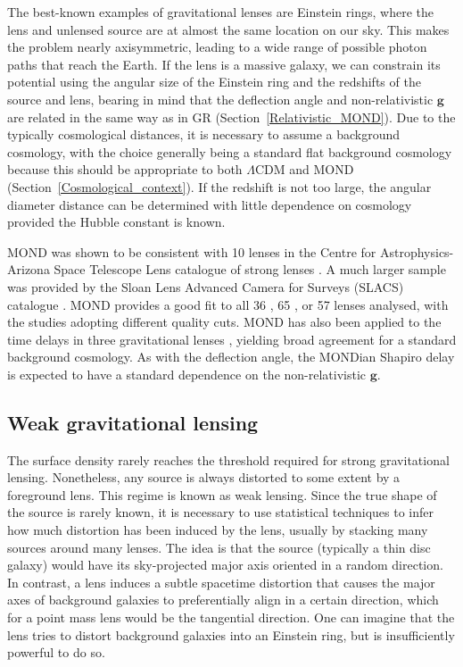 \documentclass[fleqn,usenatbib,useAMS]{mnras} %
\begin{document}
The best-known examples of gravitational lenses are Einstein rings, where the lens and unlensed source are at almost the same location on our sky. This makes the problem nearly axisymmetric, leading to a wide range of possible photon paths that reach the Earth. If the lens is a massive galaxy, we can constrain its potential using the angular size of the Einstein ring and the redshifts of the source and lens, bearing in mind that the deflection angle and non-relativistic $\bm{g}$ are related in the same way as in GR (Section~\ref{Relativistic_MOND}). Due to the typically cosmological distances, it is necessary to assume a background cosmology, with the choice generally being a standard flat background cosmology because this should be appropriate to both $\Lambda$CDM and MOND (Section~\ref{Cosmological_context}). If the redshift is not too large, the angular diameter distance can be determined with little dependence on cosmology provided the Hubble constant is known.

MOND was shown to be consistent with 10 lenses in the Centre for Astrophysics-Arizona Space Telescope Lens \citep[CASTLES;][]{Lehar_2000} catalogue of strong lenses \citep{Chiu_2011}. A much larger sample was provided by the Sloan Lens Advanced Camera for Surveys (SLACS) catalogue \citep{Bolton_2006, Auger_2009}. MOND provides a good fit to all 36 \citep{Sanders_2008}, 65 \citep{Sanders_2014}, or 57 \citep{Tian_2017} lenses analysed, with the studies adopting different quality cuts. MOND has also been applied to the time delays in three gravitational lenses \citep{Tian_2013}, yielding broad agreement for a standard background cosmology. As with the deflection angle, the MONDian Shapiro delay \citep{Shapiro_1964} is expected to have a standard dependence on the non-relativistic $\bm{g}$.



\subsection{Weak gravitational lensing}
\label{Galaxy_galaxy_weak_lensing}

The surface density rarely reaches the threshold required for strong gravitational lensing. Nonetheless, any source is always distorted to some extent by a foreground lens. This regime is known as weak lensing. Since the true shape of the source is rarely known, it is necessary to use statistical techniques to infer how much distortion has been induced by the lens, usually by stacking many sources around many lenses. The idea is that the source (typically a thin disc galaxy) would have its sky-projected major axis oriented in a random direction. In contrast, a lens induces a subtle spacetime distortion that causes the major axes of background galaxies to preferentially align in a certain direction, which for a point mass lens would be the tangential direction. One can imagine that the lens tries to distort background galaxies into an Einstein ring, but is insufficiently powerful to do so.
\end{document}
